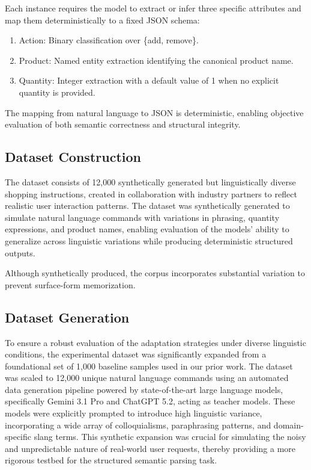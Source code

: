 \documentclass[journal,article,submit,pdftex,moreauthors]{Definitions/mdpi}
\begin{document}
Each instance requires the model to extract or infer three specific attributes and map them deterministically to a fixed JSON schema:
\begin{enumerate}
    \item Action: Binary classification over \{add, remove\}.
    \item Product: Named entity extraction identifying the canonical product name.
    \item Quantity: Integer extraction with a default value of 1 when no explicit quantity is provided.
\end{enumerate}

The mapping from natural language to JSON is deterministic, enabling objective evaluation of both semantic correctness and structural integrity.

\subsection{Dataset Construction}

The dataset consists of 12,000 synthetically generated but linguistically diverse shopping instructions, created in collaboration with industry partners to reflect realistic user interaction patterns. The dataset was synthetically generated to simulate natural language commands with variations in phrasing, quantity expressions, and product names, enabling evaluation of the models' ability to generalize across linguistic variations while producing deterministic structured outputs.

Although synthetically produced, the corpus incorporates substantial variation to prevent surface-form memorization.

\subsection{Dataset Generation}

To ensure a robust evaluation of the adaptation strategies under diverse linguistic conditions, the experimental dataset was significantly expanded from a foundational set of 1,000 baseline samples used in our prior work. The dataset was scaled to 12,000 unique natural language commands using an automated data generation pipeline powered by state-of-the-art large language models, specifically Gemini 3.1 Pro and ChatGPT 5.2, acting as teacher models. These models were explicitly prompted to introduce high linguistic variance, incorporating a wide array of colloquialisms, paraphrasing patterns, and domain-specific slang terms. This synthetic expansion was crucial for simulating the noisy and unpredictable nature of real-world user requests, thereby providing a more rigorous testbed for the structured semantic parsing task.
\end{document}
